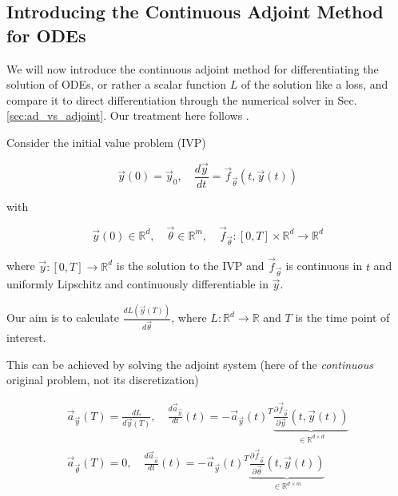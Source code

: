 
\subsection{Introducing the Continuous Adjoint Method for ODEs}

We will now introduce the continuous adjoint method for differentiating
the solution of ODEs, or rather a scalar function $L$ of the solution like a loss,
and compare it to direct differentiation through the 
numerical solver in Sec. \ref{sec:ad_vs_adjoint}. Our treatment here follows \cite{diffrax}.

Consider the initial value problem (IVP)

\begin{equation}
    \vec{y}(0) = \vec{y}_0, \quad \frac{d\vec{y}}{dt} = \vec{f}_\vec{\theta}(t,\vec{y}(t))
\end{equation}

with

\begin{equation}
    \vec{y}(0) \in \mathbb{R}^d, \quad \vec{\theta} \in \mathbb{R}^m, \quad \vec{f}_\vec{\theta}: [0,T]\times \mathbb{R}^d \rightarrow \mathbb{R}^d
\end{equation}

where $\vec{y}: [0,T] \rightarrow \mathbb{R}^d$ is the solution to the IVP and $\vec{f}_\vec{\theta}$ is 
continuous in $t$ and uniformly Lipschitz and continuously differentiable in $\vec{y}$.

Our aim is to calculate $\frac{dL(\vec{y}(T))}{d\vec{\theta}}$, where 
$L: \mathbb{R}^d \rightarrow \mathbb{R}$ and $T$ is the time point of interest.

This can be achieved by solving the adjoint system (here of the \textit{continuous}
original problem, not its discretization)

\begin{equation}
    \begin{gathered}
        \vec{a}_\vec{y}(T) = \frac{dL}{d\vec{y}(T)}, \quad \frac{d\vec{a}_\vec{y}}{dt}(t) = -\vec{a}_\vec{y}(t)^T \underbrace{\frac{\partial \vec{f}_\vec{\theta}}{\partial \vec{y}}(t,\vec{y}(t))}_{\in \mathbb{R}^{d \times d}} \\
        \vec{a}_\vec{\theta}(T) = 0, \quad \frac{d\vec{a}_\vec{\theta}}{dt}(t) = -\vec{a}_\vec{y}(t)^T \underbrace{\frac{\partial \vec{f}_\vec{\theta}}{\partial \vec{\theta}}(t,\vec{y}(t))}_{\in \mathbb{R}^{d \times m}}
    \end{gathered}
    \label{eq:continuous_adjoint}
\end{equation}

